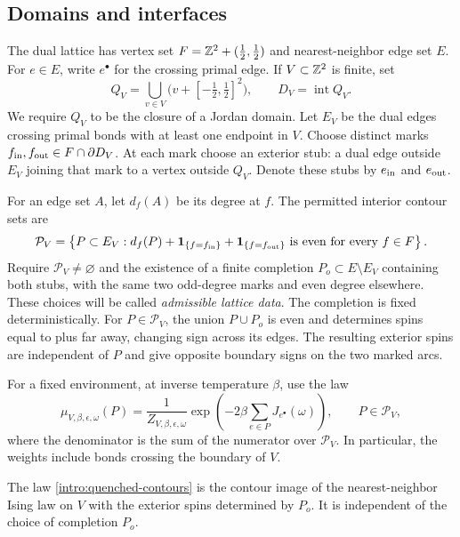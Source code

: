 \subsection{Domains and interfaces}

The dual lattice has vertex set
$F=\mathbb Z^2+(\tfrac12,\tfrac12)$ and nearest-neighbor edge set $E$.
For $e\in E$, write $e^\bullet$ for the crossing primal edge.
If $V\subset\mathbb Z^2$ is finite, set
\[
 Q_V=\bigcup_{v\in V}\bigl(v+[-\tfrac12,\tfrac12]^2\bigr),
 \qquad D_V=\operatorname{int}Q_V.
\]
We require $Q_V$ to be the closure of a Jordan domain. Let $E_V$ be
the dual edges crossing primal bonds with at least one endpoint in $V$.
Choose distinct marks $f_{\rm in},f_{\rm out}\in F\cap\partial D_V$.
At each mark choose an exterior stub: a dual edge outside $E_V$ joining
that mark to a vertex outside $Q_V$. Denote these stubs by
$e_{\rm in}$ and $e_{\rm out}$.

For an edge set $A$, let $d_f(A)$ be its degree at $f$. The permitted
interior contour sets are
\begin{equation}\label{intro:contour-space}
 \mathcal P_V=\left\{P\subset E_V:
 d_f(P)+\mathbf 1_{\{f=f_{\rm in}\}}+\mathbf 1_{\{f=f_{\rm out}\}}
                \text{ is even for every }f\in F\right\}.
\end{equation}
Require $\mathcal P_V\ne\varnothing$ and the existence of a finite
completion $P_o\subset E\setminus E_V$ containing both stubs, with
the same two odd-degree marks and even degree elsewhere. These choices
will be called \emph{admissible lattice data}. The completion is fixed
deterministically. For $P\in\mathcal P_V$, the union $P\cup P_o$
is even and determines spins equal to plus far away, changing sign
across its edges. The resulting exterior spins are independent of $P$
and give opposite boundary signs on the two marked arcs.

For a fixed environment, at inverse temperature $\beta$, use the law
\begin{equation}\label{intro:quenched-contours}
 \mu_{V,\beta,\epsilon,\omega}(P)
 =\frac1{Z_{V,\beta,\epsilon,\omega}}
       \exp\left(-2\beta\sum_{e\in P}J_{e^\bullet}(\omega)\right),
 \qquad P\in\mathcal P_V,
\end{equation}
where the denominator is the sum of the numerator over
$\mathcal P_V$. In particular, the weights include bonds crossing
the boundary of $V$.

\begin{lemma}\label{intro:contour-spin}
The law \eqref{intro:quenched-contours} is the contour image of the
nearest-neighbor Ising law on $V$ with the exterior spins determined by
$P_o$. It is independent of the choice of completion $P_o$.
\end{lemma}

